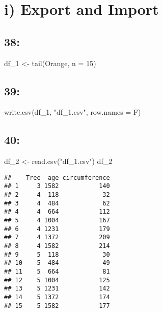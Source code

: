 \documentclass[
]{article}
\newenvironment{Shaded}{\begin{snugshade}}{\end{snugshade}}
\newcommand{\AttributeTok}[1]{\textcolor[rgb]{0.77,0.63,0.00}{#1}}
\newcommand{\DecValTok}[1]{\textcolor[rgb]{0.00,0.00,0.81}{#1}}
\newcommand{\FunctionTok}[1]{\textcolor[rgb]{0.00,0.00,0.00}{#1}}
\newcommand{\NormalTok}[1]{#1}
\newcommand{\OtherTok}[1]{\textcolor[rgb]{0.56,0.35,0.01}{#1}}
\newcommand{\StringTok}[1]{\textcolor[rgb]{0.31,0.60,0.02}{#1}}
\begin{document}
\hypertarget{i-export-and-import}{%
\section{i) Export and Import}\label{i-export-and-import}}

\hypertarget{section-37}{%
\subsection{38:}\label{section-37}}

\begin{Shaded}
\begin{Highlighting}[]
\NormalTok{df\_1 }\OtherTok{\textless{}{-}} \FunctionTok{tail}\NormalTok{(Orange, }\AttributeTok{n =} \DecValTok{15}\NormalTok{)}
\end{Highlighting}
\end{Shaded}

\hypertarget{section-38}{%
\subsection{39:}\label{section-38}}

\begin{Shaded}
\begin{Highlighting}[]
\FunctionTok{write.csv}\NormalTok{(df\_1, }\StringTok{"df\_1.csv"}\NormalTok{, }\AttributeTok{row.names =}\NormalTok{ F)}
\end{Highlighting}
\end{Shaded}

\hypertarget{section-39}{%
\subsection{40:}\label{section-39}}

\begin{Shaded}
\begin{Highlighting}[]
\NormalTok{df\_2 }\OtherTok{\textless{}{-}} \FunctionTok{read.csv}\NormalTok{(}\StringTok{"df\_1.csv"}\NormalTok{)}
\NormalTok{df\_2}
\end{Highlighting}
\end{Shaded}

\begin{verbatim}
##    Tree  age circumference
## 1     3 1582           140
## 2     4  118            32
## 3     4  484            62
## 4     4  664           112
## 5     4 1004           167
## 6     4 1231           179
## 7     4 1372           209
## 8     4 1582           214
## 9     5  118            30
## 10    5  484            49
## 11    5  664            81
## 12    5 1004           125
## 13    5 1231           142
## 14    5 1372           174
## 15    5 1582           177
\end{verbatim}
\end{document}
